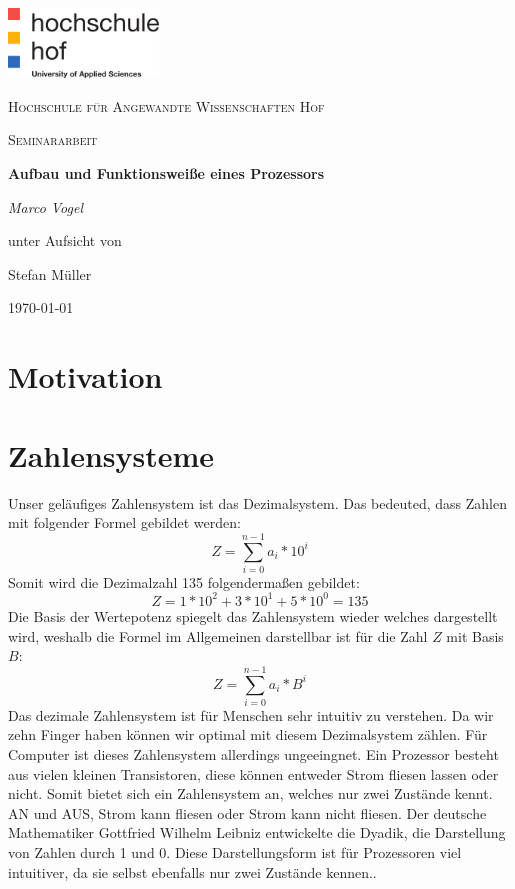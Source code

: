 \documentclass[12pt]{article}
\begin{document}
\begin{titlepage}
	\centering
	\includegraphics[width=0.3\textwidth]{logo}\par\vspace{1cm}
	{\scshape\LARGE Hochschule für Angewandte Wissenschaften Hof \par}
	\vspace{1cm}
	{\scshape\Large Seminararbeit\par}
	\vspace{1.5cm}
	{\huge\bfseries Aufbau und Funktionsweiße eines Prozessors\par}
	\vspace{2cm}
	{\Large\itshape Marco Vogel\par}
	\vfill
	unter Aufsicht von\par
	Stefan Müller
	\vfill
	{\large \today\par}
\end{titlepage}
\newpage


\tableofcontents
\newpage
\listofcodes





\section{Motivation}
\section{Zahlensysteme}
Unser geläufiges Zahlensystem ist das Dezimalsystem. Das bedeuted, dass Zahlen mit folgender Formel gebildet werden:
$$Z=\sum\limits_{i=0}^{n-1} a_i * 10^i$$
Somit wird die Dezimalzahl 135 folgendermaßen gebildet:$$Z=1*10^2+3*10^1+5*10^0 = 135$$
Die Basis der Wertepotenz spiegelt das Zahlensystem wieder welches dargestellt wird, weshalb die Formel im Allgemeinen darstellbar ist für die Zahl $Z$ mit Basis $B$:
$$Z=\sum\limits_{i=0}^{n-1} a_i * B^i$$
Das dezimale Zahlensystem ist für Menschen sehr intuitiv zu verstehen. Da wir zehn Finger haben können wir optimal mit diesem Dezimalsystem zählen. Für Computer ist dieses Zahlensystem allerdings ungeeingnet. Ein Prozessor besteht aus vielen kleinen Transistoren, diese können entweder Strom fliesen lassen oder nicht. Somit bietet sich ein Zahlensystem an, welches nur zwei Zustände kennt. AN und AUS, Strom kann fliesen oder Strom kann nicht fliesen. Der deutsche Mathematiker Gottfried Wilhelm Leibniz entwickelte die Dyadik, die Darstellung von Zahlen durch 1 und 0. Diese Darstellungsform ist für Prozessoren viel intuitiver, da sie selbst ebenfalls nur zwei Zustände kennen.\cite{wiki:dual}.
\end{document}
